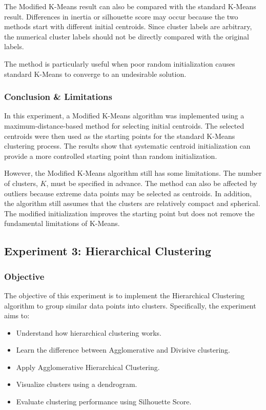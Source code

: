\documentclass[a4paper,11pt]{article}
\begin{document}
The Modified K-Means result can also be compared with the standard K-Means result. Differences in inertia or silhouette score may occur because the two methods start with different initial centroids. Since cluster labels are arbitrary, the numerical cluster labels should not be directly compared with the original labels.

The method is particularly useful when poor random initialization causes standard K-Means to converge to an undesirable solution.

\subsubsection{Conclusion \& Limitations}

In this experiment, a Modified K-Means algorithm was implemented using a maximum-distance-based method for selecting initial centroids. The selected centroids were then used as the starting points for the standard K-Means clustering process. The results show that systematic centroid initialization can provide a more controlled starting point than random initialization.

However, the Modified K-Means algorithm still has some limitations. The number of clusters, $K$, must be specified in advance. The method can also be affected by outliers because extreme data points may be selected as centroids. In addition, the algorithm still assumes that the clusters are relatively compact and spherical. The modified initialization improves the starting point but does not remove the fundamental limitations of K-Means.

\subsection{Experiment 3: Hierarchical Clustering}

\subsubsection{Objective}
The objective of this experiment is to implement the Hierarchical Clustering algorithm to group similar data points into clusters. Specifically, the experiment aims to:
\begin{itemize}
    \item Understand how hierarchical clustering works.
    \item Learn the difference between Agglomerative and Divisive clustering.
    \item Apply Agglomerative Hierarchical Clustering.
    \item Visualize clusters using a dendrogram.
    \item Evaluate clustering performance using Silhouette Score.
\end{itemize}
\end{document}
